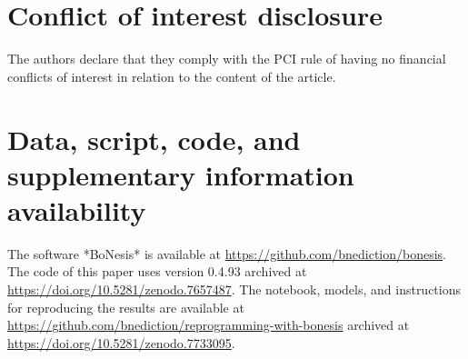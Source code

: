 \documentclass[PCJ,Unicode,screen,mode=plain]{cedram}
\begin{document}
\section*{Conflict of interest disclosure}

The authors declare that they comply with the PCI rule of having no financial
conflicts of interest in relation to the content of the article.

\section*{Data, script, code, and supplementary information availability}

The software *BoNesis* is available at \url{https://github.com/bnediction/bonesis}. The code of this
paper uses version 0.4.93 archived at \url{https://doi.org/10.5281/zenodo.7657487}.
The notebook, models, and instructions for reproducing the results are available at
\url{https://github.com/bnediction/reprogramming-with-bonesis} archived at
\url{https://doi.org/10.5281/zenodo.7733095}.

\printbibliography
\end{document}
